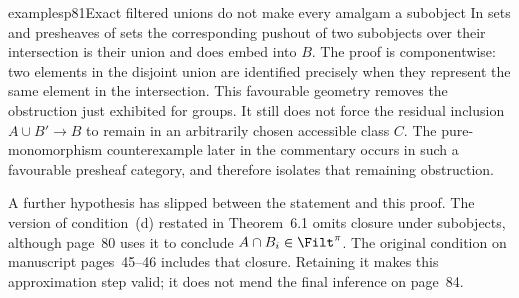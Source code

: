 \begin{dcomment}{examples}{p81}{Exact filtered unions do not make every amalgam a subobject}
In sets and presheaves of sets the corresponding pushout of two subobjects over their intersection is their union and does embed into $B$. The proof is componentwise: two elements in the disjoint union are identified precisely when they represent the same element in the intersection. This favourable geometry removes the obstruction just exhibited for groups. It still does not force the residual inclusion $A\cup B'\to B$ to remain in an arbitrarily chosen accessible class $C$. The pure-monomorphism counterexample later in the commentary occurs in such a favourable presheaf category, and therefore isolates that remaining obstruction.

A further hypothesis has slipped between the statement and this proof. The version of condition~(d) restated in Theorem~6.1 omits closure under subobjects, although page~80 uses it to conclude $A\cap B_i\in\Filt^\pi$. The original condition on manuscript pages~45--46 includes that closure. Retaining it makes this approximation step valid; it does not mend the final inference on page~84.
\end{dcomment}

